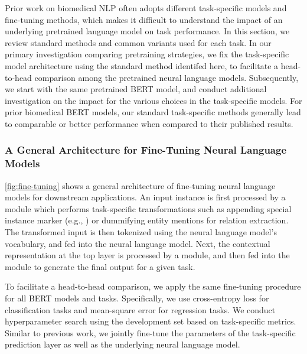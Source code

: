 \documentclass[acmlarge,screen,nonacm]{acmart}
\begin{document}
Prior work on biomedical NLP often adopts different task-specific models and fine-tuning methods, which makes it difficult to understand the impact of an underlying pretrained language model on task performance. 
In this section, we review standard methods and common variants used for each task.
In our primary investigation comparing pretraining strategies, we fix the task-specific model architecture using the standard method identifed here, to facilitate a head-to-head comparison among the pretrained neural language models. 
Subsequently, we start with the same pretrained BERT model, and conduct additional investigation on the impact for the various choices in the task-specific models.
For prior biomedical BERT models, our standard task-specific methods generally lead to comparable or better performance when compared to their published results.

\subsubsection{A General Architecture for Fine-Tuning Neural Language Models}

\autoref{fig:fine-tuning} shows a general architecture of fine-tuning neural language models for downstream applications. 
An input instance is first processed by a  module which performs task-specific transformations such as appending special instance marker (e.g., ) or dummifying entity mentions for relation extraction.
The transformed input is then tokenized using the neural language model's vocabulary, and fed into the neural language model. Next, the contextual representation at the top layer is processed by a  module, and then fed into the  module to generate the final output for a given task. 

To facilitate a head-to-head comparison, we apply the same fine-tuning procedure for all BERT models and tasks. Specifically, we use cross-entropy loss for classification tasks and mean-square error for regression tasks. We conduct hyperparameter search using the development set based on task-specific metrics. Similar to previous work, we jointly fine-tune the parameters of the task-specific prediction layer as well as the underlying neural language model.
\end{document}
